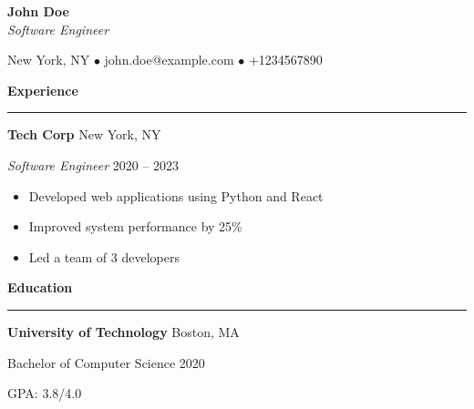 \documentclass[letterpaper,11pt]{article}
\begin{document}
\begin{center}
    {\Large\textbf{John Doe}}\\[6pt]
    {\normalsize\textit{Software Engineer}}\\[6pt]
    \hrulefill
\end{center}

\begin{center}
    New York, NY $\bullet$ john.doe@example.com $\bullet$ +1234567890
\end{center}

\vspace{16pt}
\begin{center}
    {\Large\bfseries Experience}
    \vspace{2pt}
    \hrule
\end{center}
\vspace{10pt}

\textbf{Tech Corp} \hfill New York, NY

\textit{Software Engineer} \hfill 2020 -- 2023

\begin{itemize}[leftmargin=*,itemsep=2pt,parsep=2pt,topsep=4pt]
    \item Developed web applications using Python and React
    \item Improved system performance by 25\%
    \item Led a team of 3 developers
\end{itemize}

\vspace{16pt}
\begin{center}
    {\Large\bfseries Education}
    \vspace{2pt}
    \hrule
\end{center}
\vspace{10pt}

\textbf{University of Technology} \hfill Boston, MA

Bachelor of Computer Science \hfill 2020

GPA: 3.8/4.0
\end{document}
